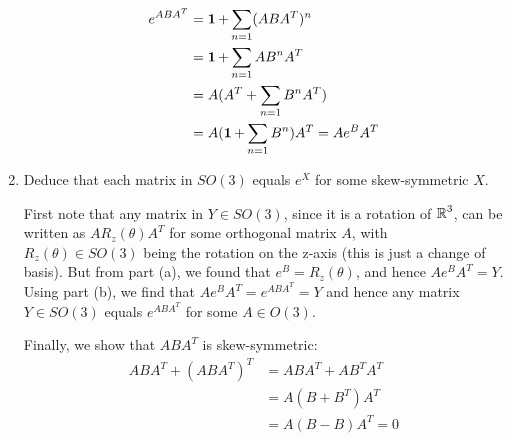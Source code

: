 \documentclass[12pt,onecolumn]{article}
\begin{document}
\begin{exercise}
\begin{enumerate}[label=(\alph*)]
\begin{answer}
\begin{align*}
        e^{ABA^T} &= \operatorname{\mathbf{1}} + \sum_{n=1} (ABA^T)^n \\
        &= \operatorname{\mathbf{1}} + \sum_{n=1} AB^nA^T \\
        &= A(A^T + \sum_{n=1} B^nA^T ) \\
        &= A(\operatorname{\mathbf{1}} + \sum_{n=1} B^n)A^T = Ae^BA^T
    \end{align*}
    \end{answer}
    \item Deduce that each matrix in $SO(3)$ equals $e^X$ for some skew-symmetric $X$.
    \begin{answer}
    First note that any matrix in $Y \in SO(3)$, since it is a rotation of $\operatorname{\mathbb{R}}^3$, can be written as $AR_z(\theta)A^T$ for some orthogonal matrix  $A$, with $R_z(\theta) \in SO(3)$ being the rotation on the z-axis (this is just a change of basis). But from part (a), we found that $e^B = R_z(\theta)$, and hence $Ae^BA^T = Y$. Using part (b), we find that $Ae^BA^T = e^{ABA^T} = Y$ and hence any matrix $Y \in SO(3)$ equals $e^{ABA^T}$ for some $A \in O(3)$. 
    
    Finally, we show that $ABA^T$ is skew-symmetric:
    \begin{align*}
        ABA^T + (ABA^T)^T &= ABA^T + AB^TA^T \\
        &= A(B+B^T)A^T \\
        &= A(B-B)A^T = 0
    \end{align*}
    \end{answer}
\end{enumerate}

\end{exercise}
\end{document}
